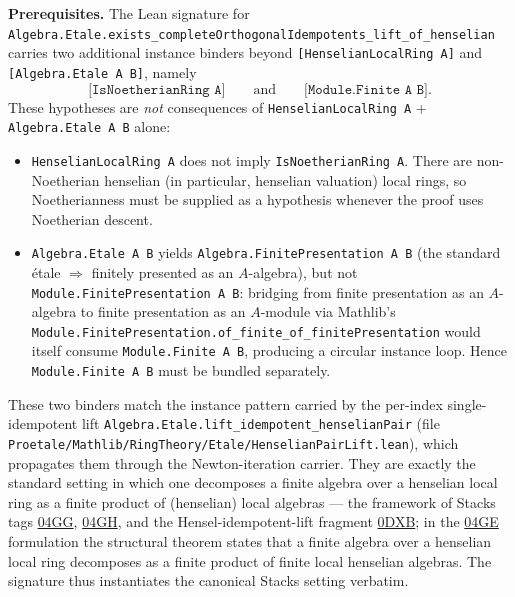 \medskip\noindent\textbf{Prerequisites.} The Lean signature for
\texttt{Algebra.Etale.exists\_completeOrthogonalIdempotents\_lift\_of\_henselian}
carries two additional instance binders beyond
\texttt{[HenselianLocalRing A]} and \texttt{[Algebra.Etale A B]},
namely
\[
  \texttt{[IsNoetherianRing A]} \qquad \text{and} \qquad
  \texttt{[Module.Finite A B]}.
\]
These hypotheses are \emph{not} consequences of
\texttt{HenselianLocalRing A} + \texttt{Algebra.Etale A B} alone:
\begin{itemize}
  \item \texttt{HenselianLocalRing A} does not imply
    \texttt{IsNoetherianRing A}. There are non-Noetherian
    henselian (in particular, henselian valuation) local rings, so
    Noetherianness must be supplied as a hypothesis whenever the
    proof uses Noetherian descent.
  \item \texttt{Algebra.Etale A B} yields
    \texttt{Algebra.FinitePresentation A B} (the standard étale $\Rightarrow$
    finitely presented as an $A$-algebra), but not
    \texttt{Module.FinitePresentation A B}: bridging from finite
    presentation as an $A$-algebra to finite presentation as an
    $A$-module via Mathlib's
    \texttt{Module.FinitePresentation.of\_finite\_of\_finitePresentation}
    would itself consume \texttt{Module.Finite A B}, producing a
    circular instance loop. Hence \texttt{Module.Finite A B} must be
    bundled separately.
\end{itemize}
These two binders match the instance pattern carried by the per-index
single-idempotent lift
\texttt{Algebra.Etale.lift\_idempotent\_henselianPair} (file
\texttt{Proetale/Mathlib/RingTheory/Etale/HenselianPairLift.lean}),
which propagates them through the Newton-iteration carrier. They are
exactly the standard setting in which one decomposes a finite algebra
over a henselian local ring as a finite product of (henselian) local
algebras — the framework of Stacks tags
\href{https://stacks.math.columbia.edu/tag/04GG}{04GG},
\href{https://stacks.math.columbia.edu/tag/04GH}{04GH}, and the
Hensel-idempotent-lift fragment
\href{https://stacks.math.columbia.edu/tag/0DXB}{0DXB}; in the
\href{https://stacks.math.columbia.edu/tag/04GE}{04GE} formulation
the structural theorem states that a finite algebra over a henselian
local ring decomposes as a finite product of finite local henselian
algebras. The signature thus instantiates the canonical Stacks setting
verbatim.

